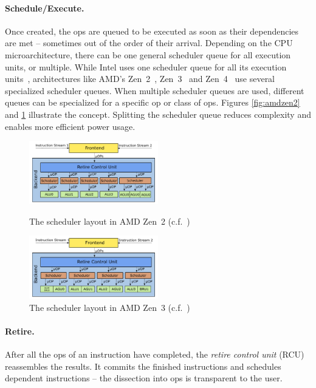 \documentclass[11pt,
  titlepage=false,
]{scrreprt}
\begin{document}
\paragraph{Schedule/Execute.}
Once created, the \textmu ops are queued to be executed as soon as their dependencies are met -- sometimes out of the order of their arrival.
Depending on the CPU microarchitecture, there can be one general scheduler queue for all execution units, or multiple.
While Intel uses one scheduler queue for all its execution units~\cite{Intel_opt},
architectures like AMD's Zen~2~\cite{AMD2020OptimizationEPYC7002}, Zen~3~\cite{AMD2020OptimizationEPYC7003} and Zen~4~\cite{AMD2023OptimizationZen4} use several specialized scheduler queues.
When multiple scheduler queues are used, different queues can be specialized for a specific \textmu op or class of \textmu ops.
Figures \ref{fig:amdzen2} and \ref{fig:amdzen3} illustrate the concept.
Splitting the scheduler queue reduces complexity and enables more efficient power usage.

\begin{figure}
    \centering
    \includegraphics[width=0.5\textwidth]{figures/Zen2 arch}

    \caption{The scheduler layout in AMD Zen~2 (c.f.~\cite{AMD2020OptimizationEPYC7002})}
    \label{fig:amdzen2}

    \includegraphics[width=0.5\textwidth]{figures/Zen3 arch}

    \caption{The scheduler layout in AMD Zen~3 (c.f.~\cite{AMD2020OptimizationEPYC7003})}
    \label{fig:amdzen3}
\end{figure}

\paragraph{Retire.}
After all the \textmu ops of an instruction have completed, the \textit{retire control unit} (RCU) reassembles the results.
It commits the finished instructions and schedules dependent instructions -- the dissection into \textmu ops is transparent to the user.
\end{document}
